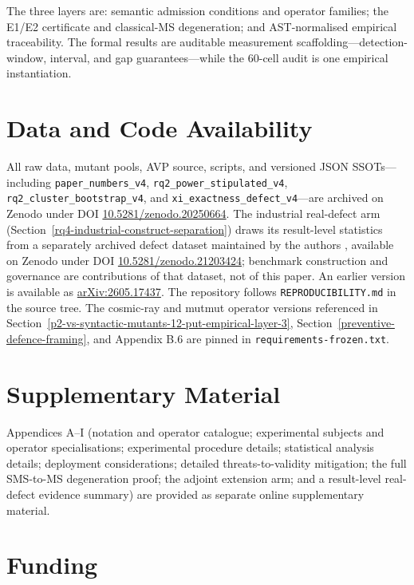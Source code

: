 \documentclass[manuscript,screen,review]{acmart}
\begin{document}
The three layers are: semantic admission conditions and operator
families; the E1/E2 certificate and classical-MS degeneration; and
AST-normalised empirical traceability. The formal results are auditable
measurement scaffolding---detection-window, interval, and gap
guarantees---while the 60-cell audit is one empirical instantiation.

\section*{Data and Code Availability}\label{data-and-code-availability}

All raw data, mutant pools, AVP source, scripts, and versioned JSON
SSOTs---including \texttt{paper\_numbers\_v4},
\texttt{rq2\_power\_stipulated\_v4},
\texttt{rq2\_cluster\_bootstrap\_v4}, and
\texttt{xi\_exactness\_defect\_v4}---are archived on Zenodo under DOI
\href{https://doi.org/10.5281/zenodo.20250664}{10.5281/zenodo.20250664}.
The industrial real-defect arm (Section~\ref{rq4-industrial-construct-separation}) draws its result-level
statistics from a separately archived defect dataset maintained by the
authors \citep{defect4mr2026}, available on Zenodo under DOI
\href{https://doi.org/10.5281/zenodo.21203424}{10.5281/zenodo.21203424};
benchmark construction and governance are contributions of that dataset,
not of this paper.
An earlier version is available as
\href{https://arxiv.org/abs/2605.17437}{arXiv:2605.17437}. The repository follows
\texttt{REPRODUCIBILITY.md} in the source tree. The cosmic-ray and
mutmut operator versions referenced in Section~\ref{p2-vs-syntactic-mutants-12-put-empirical-layer-3}, Section~\ref{preventive-defence-framing}, and Appendix B.6 are
pinned in \texttt{requirements-frozen.txt}.



\section*{Supplementary Material}

Appendices A--I (notation and operator catalogue; experimental subjects and
operator specialisations; experimental procedure details; statistical analysis
details; deployment considerations; detailed threats-to-validity mitigation;
the full SMS-to-MS degeneration proof; the adjoint extension arm; and a
result-level real-defect evidence summary) are provided as separate online
supplementary material.

\section*{Funding}
\end{document}

